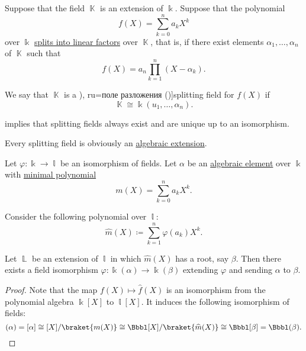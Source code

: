 \begin{definition}\label{def:splitting_field}
  Suppose that the field \( \BbbK \) is an extension of \( \Bbbk \). Suppose that the polynomial
  \begin{equation*}
     f(X) = \sum_{k=0}^n a_k X^k
  \end{equation*}
  over \( \Bbbk \) \hyperref[def:polynomial_splits_into_linear_factors]{splits into linear factors} over \( \BbbK \), that is, if there exist elements \( \alpha_1, \ldots, \alpha_n \) of \( \BbbK \) such that
  \begin{equation*}
    f(X) = a_n \prod_{k=1}^n (X - \alpha_k).
  \end{equation*}

  We say that \( \BbbK \) is a \term[bg=поле на разлагане (\cite[429]{Обрешков1962ВисшаАлгебра}), ru=поле разложения (\cite[def. 9.5.2]{Винберг2014Алгебра})]{splitting field} for \( f(X) \) if
  \begin{equation*}
    \BbbK \cong \Bbbk(u_1, \ldots, \alpha_n).
  \end{equation*}
\end{definition}
\begin{comments}
  \item {} implies that splitting fields always exist and are unique up to an isomorphism.
  \item Every splitting field is obviously an \hyperref[def:algebraic_extension]{algebraic extension}.
\end{comments}

\begin{lemma}\label{thm:splitting_field_uniqueness_step}
  Let \( \varphi: \Bbbk \to \Bbbl \) be an isomorphism of fields. Let \( \alpha \) be an \hyperref[def:algebraic_element]{algebraic element} over \( \Bbbk \) with \hyperref[def:algebraic_element_minimal_polynomial]{minimal polynomial}
  \begin{equation*}
     m(X) = \sum_{k=0}^n a_k X^k.
  \end{equation*}

  Consider the following polynomial over \( \Bbbl \):
  \begin{equation*}
    \widehat{m}(X) \coloneqq \sum_{k=1}^n \varphi(a_k) X^k.
  \end{equation*}

  Let \( \BbbL \) be an extension of \( \Bbbl \) in which \( \widehat{m}(X) \) has a root, say \( \beta \). Then there exists a field isomorphism \( \varphi: \Bbbk(\alpha) \to \Bbbk(\beta) \) extending \( \varphi \) and sending \( \alpha \) to \( \beta \).
\end{lemma}
\begin{proof}
  Note that the map \( f(X) \mapsto \widehat{f}(X) \) is an isomorphism from the polynomial algebra \( \Bbbk[X] \) to \( \Bbbl[X] \). It induces the following isomorphism of fields:
  \begin{equation*}
    \Bbbk(\alpha) = \Bbbk[\alpha] \cong \Bbbk[X] / \braket{ m(X) } \cong \Bbbl[X] / \braket{ \widehat{m}(X) } \cong \Bbbl[\beta] = \Bbbl(\beta).
  \end{equation*}
\end{proof}

